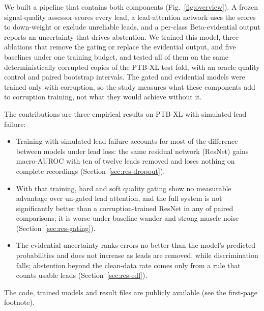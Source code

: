 We built a pipeline that contains both components (Fig.~\ref{fig:overview}). A frozen signal-quality assessor
scores every lead, a lead-attention network uses the scores to down-weight or exclude unreliable leads, and a
per-class Beta-evidential output reports an uncertainty that drives abstention. We trained this model, three
ablations that remove the gating or replace the evidential output, and five baselines under one training budget,
and tested all of them on the same deterministically corrupted copies of the PTB-XL test fold, with an oracle
quality control and paired bootstrap intervals. The gated and evidential models were trained only with
corruption, so the study measures what these components add to corruption training, not what they would achieve
without it.

The contributions are three empirical results on PTB-XL with simulated lead failure:
\begin{itemize}
  \item Training with simulated lead failure accounts for most of the difference between models under lead loss:
        the same residual network (ResNet) gains \gainDropKTen{} macro-AUROC with ten of twelve leads removed and
        loses nothing on complete recordings (Section~\ref{sec:res-dropout}).
  \item With that training, hard and soft quality gating show no measurable advantage over un-gated lead
        attention, and the full system is not significantly better than a corruption-trained ResNet in any of
        \bootNRows{} paired comparisons; it is worse under baseline wander and strong muscle noise
        (Section~\ref{sec:res-gating}).
  \item The evidential uncertainty ranks errors no better than the model's predicted probabilities and does not
        increase as leads are removed, while discrimination falls; abstention beyond the clean-data rate comes only
        from a rule that counts usable leads (Section~\ref{sec:res-edl}).
\end{itemize}
The code, trained models and result files are publicly available (see the first-page footnote).
